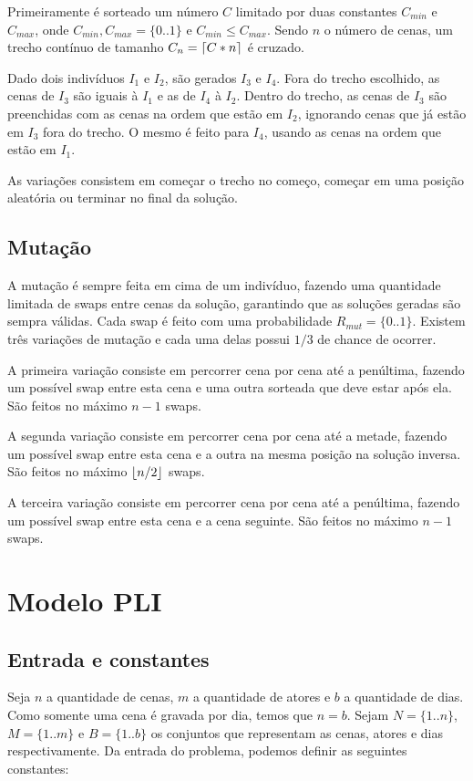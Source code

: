 \documentclass[a4paper,11pt]{article}
\DeclarePairedDelimiter{\ceil}{\lceil}{\rceil}
\DeclarePairedDelimiter{\floor}{\lfloor}{\rfloor}
\begin{document}
Primeiramente é sorteado um número $C$ limitado por duas constantes
$C_{min}$ e $C_{max}$, onde $C_{min}, C_{max} = \{0..1\}$ e $C_{min} \leq C_{max}$.
Sendo $n$ o número de cenas, um trecho contínuo de tamanho $C_n = \ceil{C * n}$ é cruzado.

Dado dois indivíduos $I_1$ e $I_2$, são gerados $I_3$ e $I_4$. Fora do trecho escolhido,
as cenas de $I_3$ são iguais à $I_1$ e as de $I_4$ à $I_2$.
Dentro do trecho, as cenas de $I_3$ são preenchidas com as cenas na ordem que estão em $I_2$,
ignorando cenas que já estão em $I_3$ fora do trecho. O mesmo é feito para $I_4$,
usando as cenas na ordem que estão em $I_1$.

As variações consistem em começar o trecho no começo, começar em uma posição aleatória ou
terminar no final da solução.

\subsection{Mutação}
A mutação é sempre feita em cima de um indivíduo, fazendo uma quantidade limitada
de swaps entre cenas da solução, garantindo que as soluções geradas são sempra válidas.
Cada swap é feito com uma probabilidade $R_{mut} = \{0..1\}$.
Existem três variações de mutação e cada uma delas possui $1/3$ de chance de ocorrer.

A primeira variação consiste em percorrer cena por cena até a penúltima, fazendo um possível
swap entre esta cena e uma outra sorteada que deve estar após ela. São feitos no máximo $n-1$ swaps.

A segunda variação consiste em percorrer cena por cena até a metade, fazendo um possível swap
entre esta cena e a outra na mesma posição na solução inversa. São feitos no máximo $\floor{n/2}$ swaps.

A terceira variação consiste em percorrer cena por cena até a penúltima, fazendo um possível swap
entre esta cena e a cena seguinte. São feitos no máximo $n-1$ swaps.

\section{Modelo PLI}
\subsection{Entrada e constantes}
Seja $n$ a quantidade de cenas, $m$ a quantidade de atores e $b$ a quantidade de
dias. Como somente uma cena é gravada por dia, temos que $n = b$. Sejam $N=\{1..n\}$,
$M = \{1..m\}$ e $B=\{1..b\}$ os conjuntos que representam as cenas, atores e dias
respectivamente. Da entrada do problema, podemos definir as seguintes constantes:
\end{document}
